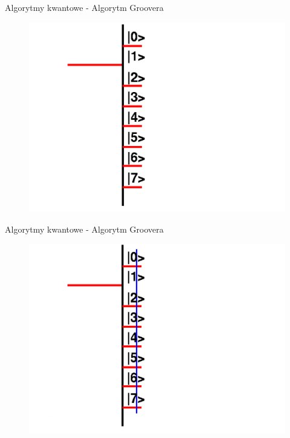 \documentclass{beamer}
\begin{document}
	\begin{frame}{Algorytmy kwantowe - Algorytm Groovera}
		\vspace{0.5em}
		\begin{center}
			\begin{figure}
				\includegraphics[scale=0.35]{media/visualization5.png}
			\end{figure}
		\end{center}
		\vspace{0.5em}
	\end{frame}
	
	\begin{frame}{Algorytmy kwantowe - Algorytm Groovera}
		\vspace{0.5em}
		\begin{center}
			\begin{figure}
				\includegraphics[scale=0.35]{media/visualization6.png}
			\end{figure}
		\end{center}
		\vspace{0.5em}
	\end{frame}	
	
\end{document}
